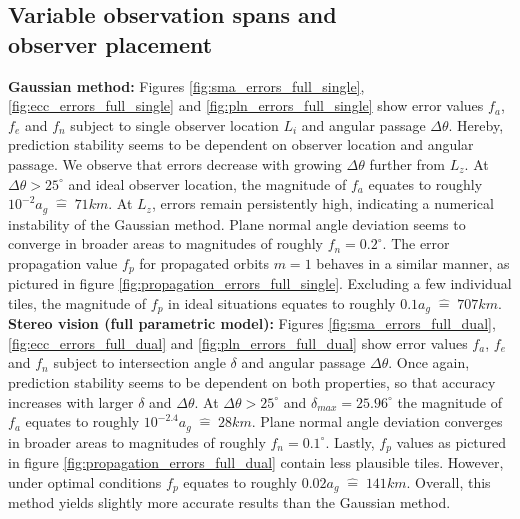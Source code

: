 \documentclass[10pt,a4paper]{article}
\begin{document}
	\subsection{Variable observation spans and \\ observer placement}\label{sec:variability_result}
	\textbf{Gaussian method:} \newline
	Figures \ref{fig:sma_errors_full_single}, \ref{fig:ecc_errors_full_single} and \ref{fig:pln_errors_full_single} show error values $f_a$, $f_e$ and $f_n$ subject to single observer location $L_i$ and angular passage $\Delta \theta$. Hereby, prediction stability seems to be dependent on observer location and angular passage. We observe that errors decrease with growing $\Delta \theta$ further from $L_z$. At $\Delta \theta > 25^\circ$ and ideal observer location, the magnitude of $f_a$ equates to roughly $10^{-2}a_g \;\widehat{=}\; 71km$. At $L_z$, errors remain persistently high, indicating a numerical instability of the Gaussian method. Plane normal angle deviation seems to converge in broader areas to magnitudes of roughly $f_n=0.2^\circ$.\newline
	The error propagation value $f_p$ for propagated orbits $m=1$ behaves in a similar manner, as pictured in figure \ref{fig:propagation_errors_full_single}. Excluding a few individual tiles, the magnitude of $f_p$ in ideal situations equates to roughly $0.1a_g \;\widehat{=}\; 707km$.
	\newline\newline
	\textbf{Stereo vision (full parametric model):}\newline
	Figures \ref{fig:sma_errors_full_dual}, \ref{fig:ecc_errors_full_dual} and \ref{fig:pln_errors_full_dual} show  error values $f_a$, $f_e$ and $f_n$ subject to intersection angle $\delta$ and angular passage $\Delta \theta$. Once again, prediction stability seems to be dependent on both properties, so that accuracy increases with larger $\delta$ and $\Delta \theta$. At $\Delta \theta > 25^\circ$ and $\delta_{max}=25.96^\circ$ the magnitude of $f_a$ equates to roughly $10^{-2.4}a_g \;\widehat{=}\; 28km$. Plane normal angle deviation converges in broader areas to magnitudes of roughly $f_n=0.1^\circ$. \newline
	Lastly, $f_p$ values as pictured in figure \ref{fig:propagation_errors_full_dual} contain less plausible tiles. However, under optimal conditions $f_p$ equates to roughly $0.02a_g \;\widehat{=}\; 141km$. Overall, this method yields slightly more accurate results than the Gaussian method.
	\newline\newline
\end{document}
